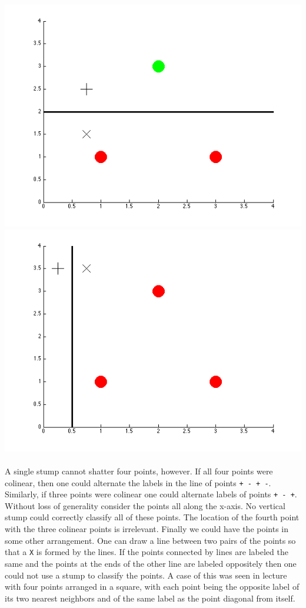 \documentclass{article}
\begin{document}
\begin{enumerate}
	\includegraphics[scale=0.25]{../images/rrg} \hfill \includegraphics[scale=0.25]{../images/rrr}\\
	\bigskip\\
	A single stump cannot shatter four points, however. If all four points were colinear, then one could alternate the labels in the line of points \texttt{+ - + -}. Similarly, if three points were colinear one could alternate labels of points \texttt{+ - +}. Without loss of generality consider the points all along the x-axis. No vertical stump could correctly classify all of these points. The location of the fourth point with the three colinear points is irrelevant. Finally we could have the points in some other arrangement. One can draw a line between two pairs of the points so that a \texttt{X} is formed by the lines. If the points connected by lines are labeled the same and the points at the ends of the other line are labeled oppositely then one could not use a stump to classify the points. A case of this was seen in lecture with four points arranged in a square, with each point being the opposite label of its two nearest neighbors and of the same label as the point diagonal from itself.


\end{enumerate}
\end{document}
